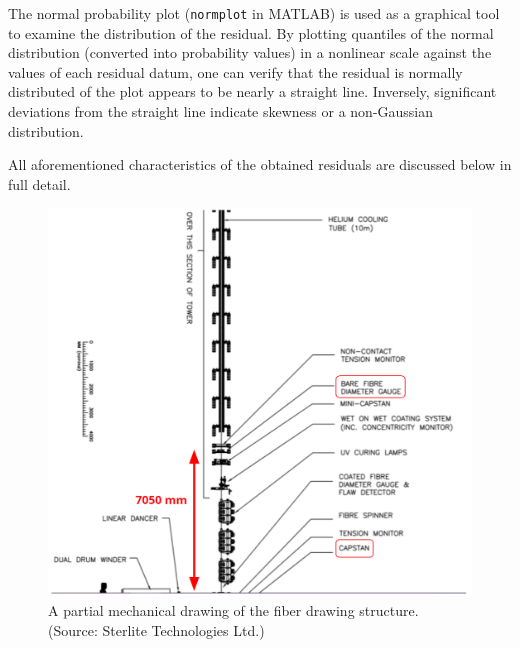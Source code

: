 

The normal probability plot (\texttt{normplot} in MATLAB) is used as a graphical tool to examine the distribution of the residual. %
By plotting quantiles of the normal distribution (converted into probability values) in a nonlinear scale against the values of each residual datum, one can verify that the residual is normally distributed of the plot appears to be nearly a straight line. Inversely, significant deviations from the straight line indicate skewness or a non-Gaussian distribution. 

All aforementioned characteristics of the obtained residuals are discussed below in full detail.

\begin{figure}[hb]
    \centering
    \includegraphics[width=\textwidth]{figures/input_delay.png}
    \caption{A partial mechanical drawing of the fiber drawing structure. (Source: Sterlite Technologies Ltd.)}
    \label{fig:input_delay}
\end{figure}

